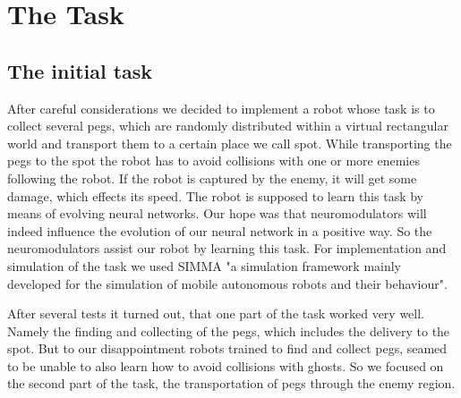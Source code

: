 \documentclass[12pt,fleqn,a4paper]{article}
\begin{document}
\section{The Task}

\subsection{The initial task}
After careful considerations we decided to implement a robot whose task is to collect several pegs, which are randomly distributed within a virtual rectangular world and transport them to a certain place we call spot. While transporting the pegs to the spot the robot has to avoid collisions with one or more enemies following the robot. If the robot is captured by the enemy, it will get some damage, which effects its speed. The robot is supposed to learn this task by means of evolving neural networks. Our hope was that neuromodulators will indeed influence the evolution of our neural network in a positive way. So the neuromodulators assist our robot by learning this task. For implementation and simulation of the task we used SIMMA "a simulation framework mainly developed for the simulation of mobile autonomous robots and their behaviour".

After several tests it turned out, that one part of the task worked very well. Namely the finding and collecting of the pegs, which includes the delivery to the spot. But to our disappointment robots trained to find and collect pegs, seamed to be unable to also learn how to avoid collisions with ghosts. So we focused on the second part of the task, the transportation of pegs through the enemy region.
\end{document}
